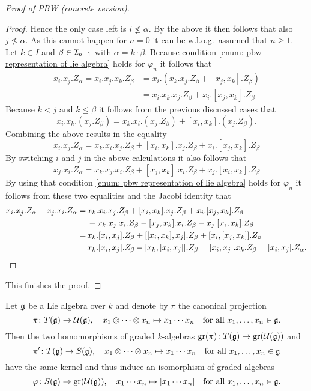 \begin{proof}[Proof of PBW (concrete version)]
\begin{proof}
  Hence the only case left is $i \nleq \alpha$. By the above it then follows that also $j \nleq \alpha$. As this cannot happen for $n = 0$ it can be w.l.o.g.\ assumed that $n \geq 1$. Let $k \in I$ and $\beta \in \mathcal{I}_{n-1}$ with $\alpha = k \cdot \beta$. Because condition \ref{enum: pbw representation of lie algebra} holds for $\varphi_n$ it follows that
  \begin{align*}
   x_i.x_j.Z_\alpha
   = x_i.x_j.x_k.Z_\beta
   &= x_i.(x_k.x_j.Z_\beta + [x_j, x_k].Z_\beta) \\
   &= x_i.x_k.x_j.Z_\beta + x_i.[x_j, x_k].Z_\beta
  \end{align*}
  Because $k < j$ and $k \leq \beta$ it follows from the previous discussed cases that
  \[
   x_i.x_k.(x_j.Z_\beta)
   = x_k.x_i.(x_j.Z_\beta) + [x_i, x_k].(x_j.Z_\beta).
  \]
  Combining the above results in the equality
  \[
   x_i.x_j.Z_\alpha
   = x_k.x_i.x_j.Z_\beta + [x_i, x_k].x_j.Z_\beta + x_i.[x_j, x_k].Z_\beta
  \]
  By switching $i$ and $j$ in the above calculations it also follows that 
  \[
   x_j.x_i.Z_\alpha
   = x_k.x_j.x_i.Z_\beta + [x_j, x_k].x_i.Z_\beta + x_j.[x_i, x_k].Z_\beta
  \]
  By using that condition \ref{enum: pbw representation of lie algebra} holds for $\varphi_n$ it follows from these two equalities and the Jacobi identity that
  \begin{align*}
        x_i.x_j.Z_\alpha - x_j.x_i.Z_\alpha 
   =&\, x_k.x_i.x_j.Z_\beta + [x_i, x_k].x_j.Z_\beta + x_i.[x_j, x_k].Z_\beta \\
    &\, - x_k.x_j.x_i.Z_\beta - [x_j, x_k].x_i.Z_\beta - x_j.[x_i, x_k].Z_\beta \\
   =&\, x_k.[x_i, x_j].Z_\beta + [[x_i, x_k], x_j].Z_\beta +  [x_i,[x_j,x_k]].Z_\beta \\
   =&\, x_k.[x_i, x_j].Z_\beta - [x_k, [x_i, x_j]].Z_\beta
   =    [x_i, x_j].x_k.Z_\beta
   =    [x_i, x_j].Z_\alpha.
  \qedhere
  \end{align*}
 \end{proof}
 This finishes the proof. 
\end{proof}


\begin{thrm} \label{thrm: pbw abstract}
 Let $\mathfrak{g}$ be a Lie algebra over $k$ and denote by $\pi$ the canonical projection
 \[
  \pi \colon T(\mathfrak{g}) \to \mathcal{U}(\mathfrak{g}), \quad
  x_1 \otimes \dotsb \otimes x_n \mapsto x_1 \dotsm x_n
  \quad \text{for all $x_1, \dotsc, x_n \in \mathfrak{g}$}.
 \]
 Then the two homomorphisms of graded $k$-algebras $\operatorname{gr}(\pi) \colon T(\mathfrak{g}) \to \operatorname{gr}(\mathcal{U}(\mathfrak{g}))$ and
 \[
  \pi' \colon T(\mathfrak{g}) \to S(\mathfrak{g}), \quad 
  x_1 \otimes \dotsb \otimes x_n \mapsto x_1 \dotsm x_n
  \quad \text{for all $x_1, \dotsc, x_n \in \mathfrak{g}$}
 \]
 have the same kernel and thus induce an isomorphism of graded algebras
 \begin{equation}\label{eqn: induced isomorphism of graded algebras}
  \varphi \colon S(\mathfrak{g}) \to \operatorname{gr}(\mathcal{U}(\mathfrak{g})), \quad
  x_1 \dotsm x_n \mapsto [x_1 \dotsm x_n]
  \quad \text{for all $x_1, \dotsc, x_n \in \mathfrak{g}$}.
 \end{equation}
\end{thrm}


